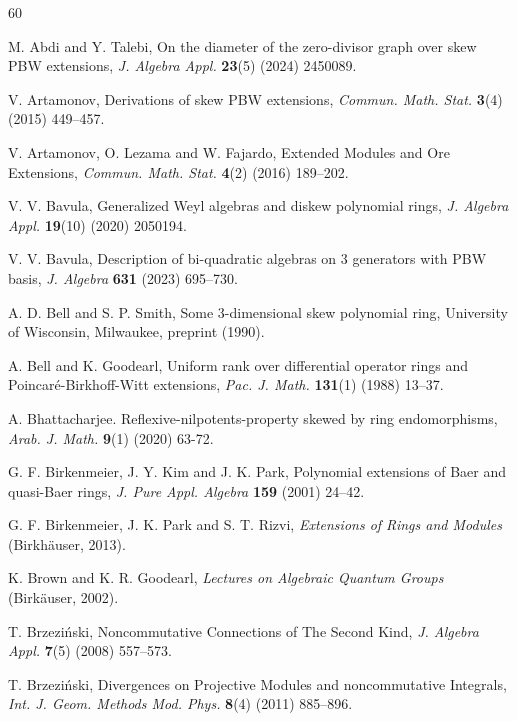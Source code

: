 \documentclass{amsart}
\theoremstyle{definition}
\theoremstyle{remark}
\numberwithin{equation}{section}
\begin{document}
\begin{thebibliography}{60}

 M. Abdi and Y. Talebi, On the diameter of the zero-divisor graph over skew PBW extensions, {\em J. Algebra Appl.} {\bf 23}(5) (2024) 2450089.

 V. Artamonov, Derivations of skew PBW extensions, {\em Commun. Math. Stat.} {\bf 3}(4) (2015) 449--457.

 V. Artamonov, O. Lezama and W. Fajardo, {E}xtended {M}odules and {O}re {E}xtensions, {\em Commun. Math. Stat.} {\bf 4}(2) (2016) 189--202.

 V. V. Bavula, Generalized Weyl algebras and diskew polynomial rings, {\em J. Algebra Appl.} {\bf 19}(10) (2020) 2050194.

 V. V. Bavula, Description of bi-quadratic algebras on 3 generators with {P}{B}{W} basis, {\em J. Algebra} {\bf 631} (2023) 695--730.

 A. D. Bell and S. P. Smith, Some 3-dimensional skew polynomial ring, University of Wisconsin, Milwaukee, preprint (1990).

 A. Bell and K. Goodearl, Uniform rank over differential operator rings and Poincar{\'e}-Birkhoff-Witt extensions, {\em Pac. J. Math.} {\bf 131}(1) (1988) 13--37.

 A. Bhattacharjee. Reflexive-nilpotents-property skewed by ring endomorphisms, \emph{Arab. J. Math.} {\bf 9}(1) (2020) 63-72.

 G. F. Birkenmeier, J. Y. Kim and J. K. Park, Polynomial extensions of Baer and quasi-Baer rings, {\em J. Pure Appl. Algebra} {\bf 159} (2001) 24--42.

 G. F. Birkenmeier, J. K. Park and   S. T. Rizvi,  {\em Extensions of Rings and Modules} (Birkh\"auser, 2013).

 K. Brown and K. R. Goodearl, {\em Lectures on Algebraic Quantum Groups} (Birk\"auser, 2002).

 T. Brzezi{\'n}ski, Noncommutative Connections of The Second Kind, {\em J. Algebra Appl.} {\bf 7}(5) (2008) 557--573.

 T. Brzezi{\'n}ski, Divergences on Projective Modules and noncommutative Integrals, {\em Int. J. Geom. Methods Mod. Phys.} {\bf 8}(4) (2011) 885--896.


\end{thebibliography}
\end{document}
